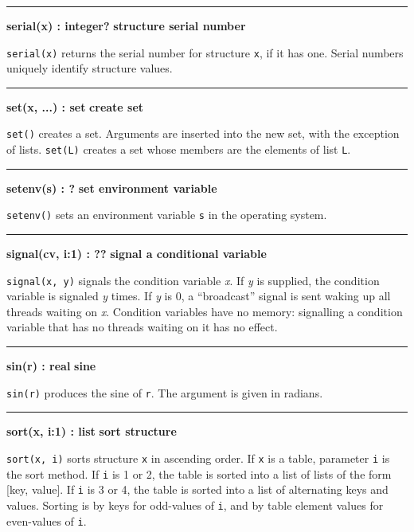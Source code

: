 \bigskip\hrule\vspace{0.1cm}
\noindent
{\bf serial(x) : integer? } \hfill {\bf structure serial number}

\noindent
{}\texttt{serial(x)} returns the serial number for
structure \texttt{x}, if it has one. Serial numbers uniquely identify
structure values.

\bigskip\hrule\vspace{0.1cm}
\noindent
{\bf set(x, ...) : set } \hfill {\bf create set}

\noindent
{}\texttt{set()} creates a set. Arguments
are inserted into the new set, with the exception of lists.
\texttt{set(L)} creates a set whose members are the elements of list
\texttt{L}.

\bigskip\hrule\vspace{0.1cm}
\noindent
{\bf setenv(s) : ? } \hfill {\bf set environment variable}

\noindent
{}\texttt{setenv()} sets an environment variable
\texttt{s} in the operating system.

\bigskip\hrule\vspace{0.1cm}
\noindent
{\bf signal(cv, i:1) : ?? } \hfill {\bf signal a conditional variable}

\noindent
{}\texttt{signal(x, y)} signals the condition variable
{\textit x}. If {\textit y} is supplied, the condition variable is
signaled {\textit y} times. If {\textit y} is 0, a ``broadcast''
signal is sent waking up all threads waiting on {\textit x}.
Condition variables have no memory: signalling a condition variable
that has no threads waiting on it has no effect.

\bigskip\hrule\vspace{0.1cm}
\noindent
{\bf sin(r) : real } \hfill {\bf sine}

\noindent
{}\texttt{sin(r)} produces the sine of
\texttt{r}. The argument is given in radians.

\bigskip\hrule\vspace{0.1cm}
\noindent
{\bf sort(x, i:1) : list } \hfill {\bf sort structure}

\noindent
{}\texttt{sort(x, i)} sorts structure \texttt{x} in
ascending order. If
\texttt{x} is a table, parameter \texttt{i} is the sort method. If
\texttt{i} is 1 or 2, the table is sorted into a list of lists of the
form [key, value]. If \texttt{i} is 3 or 4, the table is sorted into a
list of alternating keys and values. Sorting is by keys for odd-values
of \texttt{i}, and by table element values for even-values of
\texttt{i}.

